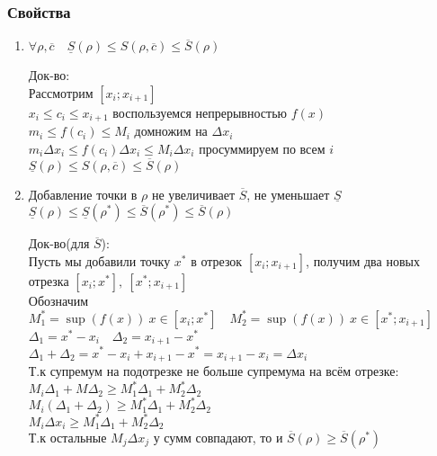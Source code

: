 \documentclass[11pt]{article}
\begin{document}
        \subsubsection{Свойства}
        \begin{enumerate}
            \item $\forall \rho, \overline{c} \quad \underline{S}(\rho) \leq S(\rho, \overline{c}) \leq \overline{S}(\rho)$
            
            Док-во:\\
            Рассмотрим $[x_i; x_{i + 1}]$\\
            $x_i \leq c_i \leq x_{i + 1}$ \quad воспользуемся непрерывностью $f(x)$\\
            $m_i \leq f(c_i) \leq M_i$ \quad домножим на $\Delta x_i$\\
            $m_i\Delta x_i \leq f(c_i)\Delta x_i \leq M_i\Delta x_i$ \quad просуммируем по всем $i$\\
            $\underline{S}(\rho) \leq S(\rho, \overline{c}) \leq \overline{S}(\rho)$

            \item Добавление точки в $\rho$ не увеличивает $\overline{S}$, не уменьшает $\underline{S}$\\
            $\underline{S}(\rho) \leq \underline{S}(\rho^*) \leq \overline{S}(\rho^*) \leq \overline{S}(\rho)$

            Док-во(для $\overline{S}$):\\
            Пусть мы добавили точку $x^*$ в отрезок $[x_i; x_{i+1}]$, получим два новых отрезка $[x_i; x^*],\ [x^*; x_{i + 1}]$\\
            Обозначим $M^*_1 = \sup(f(x))\ x \in [x_i; x^*] \quad M^*_2 = \sup(f(x))\ x \in [x^*; x_{i + 1}]$\\
            $\Delta_1 = x^* - x_i \quad \Delta_2 = x_{i + 1} - x^*$\\
            $\Delta_1 + \Delta_2 = x^* - x_i + x_{i + 1} - x^* = x_{i + 1} - x_i = \Delta x_i$\\
            Т.к супремум на подотрезке не больше супремума на всём отрезке:\\
            $M_i\Delta_1 + M\Delta_2 \geq M^*_1\Delta_1 + M^*_2\Delta_2$\\
            $M_i(\Delta_1 + \Delta_2) \geq M^*_1\Delta_1 + M^*_2\Delta_2$\\
            $M_i\Delta x_i \geq M^*_1\Delta_1 + M^*_2\Delta_2$\\
            Т.к остальные $M_j \Delta x_j$ у сумм совпадают, то и $\overline{S}(\rho) \geq \overline{S}(\rho^*)$


\end{enumerate}
\end{document}

